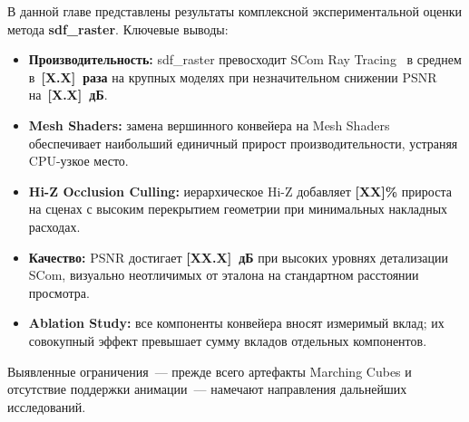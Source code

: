 В данной главе представлены результаты комплексной экспериментальной оценки
метода \textbf{sdf\_raster}. Ключевые выводы:

\begin{itemize}
  \item \textbf{Производительность:} sdf\_raster превосходит SCom Ray
    Tracing~\cite{scom2025} в среднем в~\textbf{[X.X]~раза} на крупных
    моделях при незначительном снижении PSNR на~\textbf{[X.X]~дБ}.
  \item \textbf{Mesh Shaders:} замена вершинного конвейера на Mesh Shaders
    обеспечивает наибольший единичный прирост производительности, устраняя
    CPU-узкое место.
  \item \textbf{Hi-Z Occlusion Culling:} иерархическое Hi-Z добавляет
    \textbf{[XX]\%} прироста на сценах с высоким перекрытием геометрии при
    минимальных накладных расходах.
  \item \textbf{Качество:} PSNR достигает \textbf{[XX.X]~дБ} при высоких
    уровнях детализации SCom, визуально неотличимых от эталона на стандартном
    расстоянии просмотра.
  \item \textbf{Ablation Study:} все компоненты конвейера вносят измеримый
    вклад; их совокупный эффект превышает сумму вкладов отдельных компонентов.
\end{itemize}

Выявленные ограничения~--- прежде всего артефакты Marching Cubes и
отсутствие поддержки анимации~--- намечают направления дальнейших исследований.

%
%
%
%
